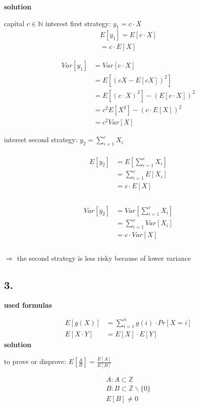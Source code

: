 \textbf{solution}

capital $c\in\mathbb{N}$
interest first strategy: $y_{1}=c\cdot X$\\

\begin{align*}
  E[y_{1}]=E[c\cdot X]\\
  =c\cdot E[X]
\end{align*}

\begin{align*}
Var[y_{1}]&=Var[c\cdot X]\\
&=E[(cX-E[cX])^{2}]\\
&=E[(c\cdot X)^{2}]-(E[c\cdot X])^{2}\\
&=c^2 E[X^2]-(c\cdot E[X])^{2}\\
&=c^{2}Var[X]
\end{align*}

interest second strategy: $y_{2}=\sum_{{i=1}}^{c}X_{i}$\\
\\
\begin{align*}
E[y_{2}]&=E[\sum_{{i=1}}^{c}X_{i}]\\
&=\sum_{{i=1}}^{c}E[X_{i}]\\
&=c\cdot E[X]\\
\end{align*}
\\
\begin{align*}
Var[y_{2}]&=Var[\sum_{{i=1}}^{c}X_{i}]\\
&=\sum_{{i=1}}^{c}Var[X_{i}]\\
&=c\cdot Var[X]\\
\end{align*}
\\
$\Rightarrow$ the second strategy is less risky because of lower variance

\subsection*{ 3. }

\textbf{used formulas}

\begin{align*}
E[g(X)] &= \sum_{i=1}^n g(i)\cdot Pr[X=i]\\
E\left[X \cdot Y\right] &= E\left[X\right]\cdot E\left[Y\right]
\end{align*}
\clearpage
\textbf{solution}

to prove or disprove: $E\left[\frac{A}{B}\right]=\frac{E\left[A\right]}{E\left[B\right]}$

\begin{align*}
A:A\subset \mathbb{Z}\\
B:B\subset \mathbb{Z}\backslash\{0\}\\
E\left[B\right]\ne 0
\end{align*}

